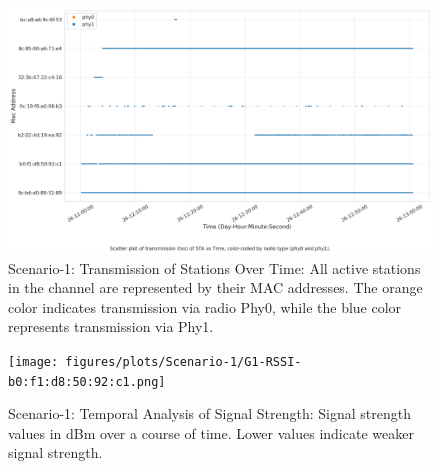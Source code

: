 \begin{landscape}
\begin{figure}[hbt!]
  \centering
  \includegraphics[width=1.45\textwidth, height=\textheight, keepaspectratio]{figures/plots/Scenario-1/G1-22.png}
\caption[Transmission of Stations Over Time]{Scenario-1: Transmission of Stations Over Time: All active stations in the channel are represented by their MAC addresses. The orange color indicates transmission via radio Phy0, while the blue color represents transmission via Phy1.}
  \label{fig:populationmap-1}
\end{figure}
\FloatBarrier 
\end{landscape}


\begin{landscape}
\begin{figure}[hbt!]
  \centering
  \texttt{[image: figures/plots/Scenario-1/G1-RSSI-b0:f1:d8:50:92:c1.png]}
  \caption[Temporal Analysis of Signal Strength]{Scenario-1: Temporal Analysis of Signal Strength: Signal strength values in dBm over a course of time. Lower values indicate weaker signal strength.}
  \label{fig:rxs-1}
\end{figure}
\FloatBarrier 
\end{landscape}


